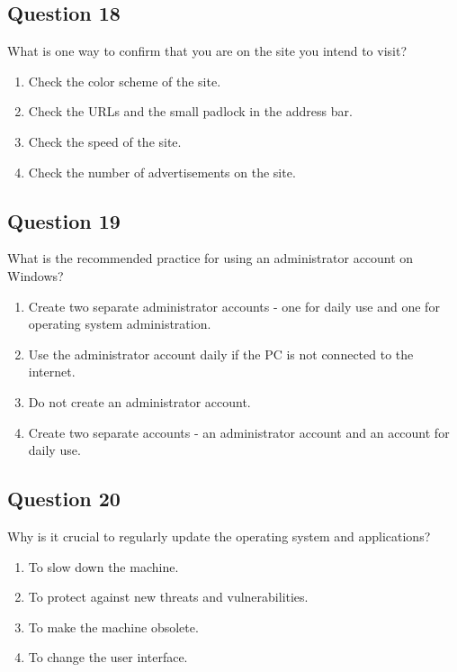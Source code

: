 \documentclass[12pt,a4paper]{article}
\begin{document}
\bigskip


\subsection*{Question 18}
What is one way to confirm that you are on the site you intend to visit?

\begin{enumerate}[label=\Alph*., leftmargin=*]
\item Check the color scheme of the site.
\item Check the URLs and the small padlock in the address bar.
\item Check the speed of the site.
\item Check the number of advertisements on the site.
\end{enumerate}

\bigskip


\subsection*{Question 19}
What is the recommended practice for using an administrator account on Windows?

\begin{enumerate}[label=\Alph*., leftmargin=*]
\item Create two separate administrator accounts - one for daily use and one for operating system administration.
\item Use the administrator account daily if the PC is not connected to the internet.
\item Do not create an administrator account.
\item Create two separate accounts - an administrator account and an account for daily use.
\end{enumerate}

\bigskip


\subsection*{Question 20}
Why is it crucial to regularly update the operating system and applications?

\begin{enumerate}[label=\Alph*., leftmargin=*]
\item To slow down the machine.
\item To protect against new threats and vulnerabilities.
\item To make the machine obsolete.
\item To change the user interface.
\end{enumerate}
\end{document}
